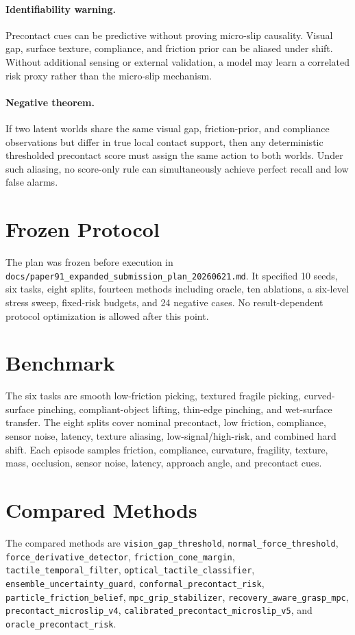 \documentclass{article}
\begin{document}
\paragraph{Identifiability warning.} Precontact cues can be predictive without proving micro-slip causality. Visual gap, surface texture, compliance, and friction prior can be aliased under shift. Without additional sensing or external validation, a model may learn a correlated risk proxy rather than the micro-slip mechanism.

\paragraph{Negative theorem.} If two latent worlds share the same visual gap, friction-prior, and compliance observations but differ in true local contact support, then any deterministic thresholded precontact score must assign the same action to both worlds. Under such aliasing, no score-only rule can simultaneously achieve perfect recall and low false alarms.

\section{Frozen Protocol}
The plan was frozen before execution in \texttt{docs/paper91\_expanded\_submission\_plan\_20260621.md}. It specified 10 seeds, six tasks, eight splits, fourteen methods including oracle, ten ablations, a six-level stress sweep, fixed-risk budgets, and 24 negative cases. No result-dependent protocol optimization is allowed after this point.

\section{Benchmark}
The six tasks are smooth low-friction picking, textured fragile picking, curved-surface pinching, compliant-object lifting, thin-edge pinching, and wet-surface transfer. The eight splits cover nominal precontact, low friction, compliance, sensor noise, latency, texture aliasing, low-signal/high-risk, and combined hard shift. Each episode samples friction, compliance, curvature, fragility, texture, mass, occlusion, sensor noise, latency, approach angle, and precontact cues.

\section{Compared Methods}
The compared methods are \texttt{vision\_gap\_threshold}, \texttt{normal\_force\_threshold}, \texttt{force\_derivative\_detector}, \texttt{friction\_cone\_margin}, \texttt{tactile\_temporal\_filter}, \texttt{optical\_tactile\_classifier}, \texttt{ensemble\_uncertainty\_guard}, \texttt{conformal\_precontact\_risk}, \texttt{particle\_friction\_belief}, \texttt{mpc\_grip\_stabilizer}, \texttt{recovery\_aware\_grasp\_mpc}, \texttt{precontact\_microslip\_v4}, \texttt{calibrated\_precontact\_microslip\_v5}, and \texttt{oracle\_precontact\_risk}.
\end{document}
